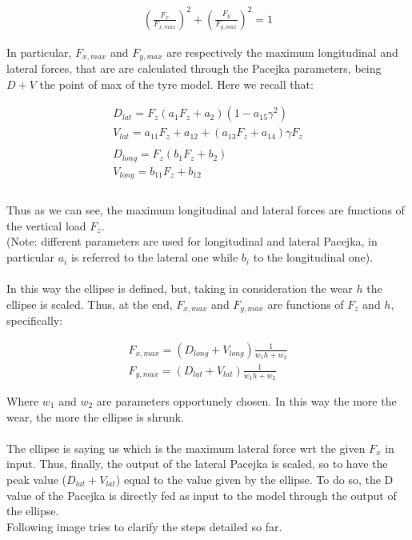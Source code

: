 \documentclass{report}
\begin{document}
\begin{equation}
\begin{aligned}
{(\frac{F_x}{F_{x,max}})}^2 + {(\frac{F_y}{F_{y,max}})}^2 = 1
\end{aligned}
\end{equation}

In particular, $F_{x,max}$ and $F_{y,max}$ are respectively the maximum longitudinal and lateral forces, that are are calculated through the Pacejka parameters, being $D + V$ the point of max of the tyre model. Here we recall that: 

\begin{equation}
\begin{aligned}
D_{lat} = F_z (a_1 F_z + a_2) (1 - a_{15} \gamma^2)\\
V_{lat} = a_{11}F_z + a_{12} + (a_{13} F_z + a_{14}) \gamma F_z\\\\
D_{long} = F_z (b_1 F_z + b_2)\\
V_{long} = b_{11}F_z + b_{12} \\\\
\end{aligned}
\end{equation}

Thus as we can see, the maximum longitudinal and lateral forces are functions of the vertical load $F_z$.\\(Note: different parameters are used for longitudinal and lateral Pacejka, in particular $a_i$ is referred to the lateral one while $b_i$ to the longitudinal one).\\\\
In this way the ellipse is defined, but, taking in consideration the wear $h$ the ellipse is scaled. Thus, at the end, $F_{x,max}$ and $F_{y,max}$ are functions of $F_z$ and $h$, specifically:

\begin{equation}
\begin{aligned}
F_{x,max} = (D_{long} + V_{long}) \frac{1}{w_1 h + w_2}\\
F_{y,max} = (D_{lat} + V_{lat}) \frac{1}{w_1 h + w_2}
\end{aligned}
\end{equation}

Where $w_1$ and $w_2$ are parameters opportunely chosen. In this way the more the wear, the more the ellipse is shrunk.\\\\
The ellipse is saying us which is the maximum lateral force wrt the given $F_x$ in input. Thus, finally, the output of the lateral Pacejka is scaled, so to have the peak value ($D_{lat}+V_{lat}$) equal to the value given by the ellipse. To do so, the D value of the Pacejka is directly fed as input to the model through the output of the ellipse.\\Following image tries to clarify the steps detailed so far.
\end{document}
